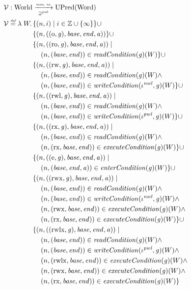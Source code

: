 \documentclass[a4paper]{article}
\newcommand{\defeq}{\stackrel{\textit{\tiny{def}}}{=}}
\newcommand{\union}{\mathbin{\cup}}
\newcommand{\var}[1]{\mathit{#1}}
\newcommand{\gl}{\var{g}}
\newcommand{\addr}{\var{a}}
\newcommand{\start}{\var{base}}
\newcommand{\addrend}{\var{end}}
\newcommand{\perm}{\var{perm}}
\newcommand{\stdcap}[1][(\perm,\gl)]{\left(#1,\start,\addrend,\addr \right)}
\newcommand{\nwl}{\var{nwl}}
\newcommand{\pwl}{\var{pwl}}
\newcommand{\plainfun}[2]{
  \ifthenelse{\equal{#2}{}}
  {\mathit{#1}}
  {\mathit{#1}(#2)}
}
\newcommand{\readCond}[1]{\plainfun{readCondition}{#1}}
\newcommand{\writeCond}[1]{\plainfun{writeCondition}{#1}}
\newcommand{\execCond}[1]{\plainfun{executeCondition}{#1}}
\newcommand{\entryCond}[1]{\plainfun{enterCondition}{#1}}
\newcommand{\futurewk}{\mathbin{\sqsupseteq}^{\var{pub}}}
\newcommand{\monwknefun}{\xrightarrow[\text{\tiny{$\futurewk$}}]{\textit{\tiny{mon, ne}}}}
\newcommand{\asmType}{\plaindom{AsmType}}
\newcommand{\plaindom}[1]{\mathrm{#1}}
\newcommand{\Words}{\plaindom{Word}}
\newcommand{\ints}{\mathbb{Z}}
\newcommand{\Worlds}{\plaindom{World}}
\newcommand{\UPred}[1]{\plaindom{UPred}(#1)}
\newcommand{\intr}[2]{\mathcal{#1}}
\newcommand{\valueintr}[1]{\intr{V}{#1}}
\newcommand{\stdvr}{\valueintr{\asmType}}
\newcommand{\npair}[2][n]{\left(#1,#2 \right)}
\newcommand{\plainperm}[1]{\mathrm{#1}}
\newcommand{\noperm}{\plainperm{o}}
\newcommand{\readonly}{\plainperm{ro}}
\newcommand{\readwrite}{\plainperm{rw}}
\newcommand{\exec}{\plainperm{rx}}
\newcommand{\entry}{\plainperm{e}}
\newcommand{\rwx}{\plainperm{rwx}}
\newcommand{\readwritel}{\plainperm{rwl}}
\newcommand{\rwlx}{\plainperm{rwlx}}
\begin{document}
\begin{align*}
  &\stdvr : \Worlds \monwknefun \UPred{\Words} \\
  &\stdvr\defeq \lambda \; W \ldotp 
    \begin{aligned}[t]
      & \{ \npair{i} \mid i \in \ints \union \{ \infty \} \} 
      \union \\
      & \{ \npair{\stdcap[(\noperm,\gl)] }  \} 
      \union \\
      & \{ \npair{\stdcap[(\readonly,\gl)] } \mid \\
      & \quad \npair{(\start,\addrend)} \in \readCond{}(\gl)(W)\} 
      \union \\
      & \{ \npair{\stdcap[(\readwrite,\gl)] } \mid \\
      & \quad \npair{(\start,\addrend)} \in \readCond{}(\gl)(W) \land \\
      & \quad \npair{(\start,\addrend)} \in \writeCond{}(\iota^\nwl,\gl)(W) \}
      \union \\
      & \{ \npair{\stdcap[(\readwritel,\gl)] } \mid \\
      & \quad \npair{(\start,\addrend)} \in \readCond{}(\gl)(W) \land \\
      & \quad \npair{(\start,\addrend)} \in \writeCond{}(\iota^\pwl,\gl)(W) \}
      \union \\
      & \{ \npair{\stdcap[(\exec,\gl)]} \mid \\
      & \quad \npair{(\start,\addrend)} \in \readCond{}(\gl)(W) \land \\
      & \quad \npair{(\exec,\start,\addrend)} \in \execCond{}(\gl)(W) \} 
      \union \\
      & \{ \npair{\stdcap[(\entry,\gl)]} \mid \\
      & \quad \npair{(\start,\addrend,\addr)} \in \entryCond{}(\gl)(W)\} 
      \union \\
      & \{ \npair{\stdcap[(\rwx,\gl)]} \mid \\
      & \quad \npair{(\start,\addrend)} \in \readCond{}(\gl)(W) \land \\
      & \quad \npair{(\start,\addrend)} \in \writeCond{}(\iota^\nwl,\gl)(W) \land\\
      & \quad \npair{(\rwx,\start,\addrend)} \in \execCond{}(\gl)(W)  \land \\
      & \quad \npair{(\exec,\start,\addrend)} \in \execCond{}(\gl)(W) \}
      \union \\
      & \{ \npair{\stdcap[(\rwlx,\gl)]} \mid \\
      & \quad \npair{(\start,\addrend)} \in \readCond{}(\gl)(W) \land \\
      & \quad \npair{(\start,\addrend)} \in \writeCond{}(\iota^\pwl,\gl)(W) \land\\
      & \quad \npair{(\rwlx,\start,\addrend)} \in \execCond{}(\gl)(W) \land \\
      & \quad \npair{(\rwx,\start,\addrend)} \in \execCond{}(\gl)(W) \land \\
      & \quad \npair{(\exec,\start,\addrend)} \in \execCond{}(\gl)(W) \}
    \end{aligned}
\end{align*}
\end{document}
